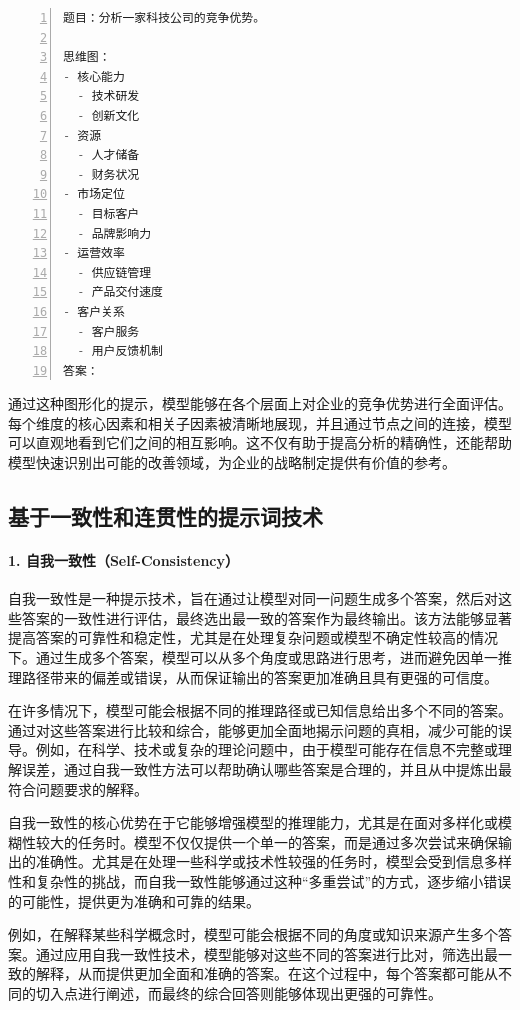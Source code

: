 \begin{lstlisting}[language={python},label={},caption={}, basicstyle=\footnotesize\ttfamily, breaklines=true, numbers=left, frame=single]
题目：分析一家科技公司的竞争优势。

思维图：
- 核心能力
  - 技术研发
  - 创新文化
- 资源
  - 人才储备
  - 财务状况
- 市场定位
  - 目标客户
  - 品牌影响力
- 运营效率
  - 供应链管理
  - 产品交付速度
- 客户关系
  - 客户服务
  - 用户反馈机制
答案：
\end{lstlisting}

通过这种图形化的提示，模型能够在各个层面上对企业的竞争优势进行全面评估。每个维度的核心因素和相关子因素被清晰地展现，并且通过节点之间的连接，模型可以直观地看到它们之间的相互影响。这不仅有助于提高分析的精确性，还能帮助模型快速识别出可能的改善领域，为企业的战略制定提供有价值的参考。

\subsection{基于一致性和连贯性的提示词技术}

\paragraph{1. 自我一致性（Self-Consistency）} 

自我一致性是一种提示技术，旨在通过让模型对同一问题生成多个答案，然后对这些答案的一致性进行评估，最终选出最一致的答案作为最终输出。该方法能够显著提高答案的可靠性和稳定性，尤其是在处理复杂问题或模型不确定性较高的情况下。通过生成多个答案，模型可以从多个角度或思路进行思考，进而避免因单一推理路径带来的偏差或错误，从而保证输出的答案更加准确且具有更强的可信度。

在许多情况下，模型可能会根据不同的推理路径或已知信息给出多个不同的答案。通过对这些答案进行比较和综合，能够更加全面地揭示问题的真相，减少可能的误导。例如，在科学、技术或复杂的理论问题中，由于模型可能存在信息不完整或理解误差，通过自我一致性方法可以帮助确认哪些答案是合理的，并且从中提炼出最符合问题要求的解释。

自我一致性的核心优势在于它能够增强模型的推理能力，尤其是在面对多样化或模糊性较大的任务时。模型不仅仅提供一个单一的答案，而是通过多次尝试来确保输出的准确性。尤其是在处理一些科学或技术性较强的任务时，模型会受到信息多样性和复杂性的挑战，而自我一致性能够通过这种“多重尝试”的方式，逐步缩小错误的可能性，提供更为准确和可靠的结果。

例如，在解释某些科学概念时，模型可能会根据不同的角度或知识来源产生多个答案。通过应用自我一致性技术，模型能够对这些不同的答案进行比对，筛选出最一致的解释，从而提供更加全面和准确的答案。在这个过程中，每个答案都可能从不同的切入点进行阐述，而最终的综合回答则能够体现出更强的可靠性。



